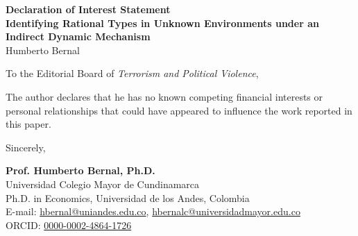 \documentclass[12pt]{article}
\begin{document}
\singlespacing

\begin{center}
\textbf{Declaration of Interest Statement} \\
\vspace{1em}
\textbf{Identifying Rational Types in Unknown Environments under an Indirect Dynamic Mechanism} \\
Humberto Bernal
\end{center}

\vspace{3em}

\noindent To the Editorial Board of \textit{Terrorism and Political Violence},

\vspace{2em}

\noindent The author declares that he has no known competing financial interests or personal relationships that could have appeared to influence the work reported in this paper.

\vspace{4em}

\begin{flushleft}
Sincerely,

\vspace{3em}

\textbf{Prof. Humberto Bernal, Ph.D.} \\
Universidad Colegio Mayor de Cundinamarca \\
Ph.D. in Economics, Universidad de los Andes, Colombia \\
E-mail: \href{mailto:hbernal@uniandes.edu.co}{hbernal@uniandes.edu.co}, \href{mailto:hbernalc@universidadmayor.edu.co}{hbernalc@universidadmayor.edu.co} \\
ORCID: \href{https://orcid.org/0000-0002-4864-1726}{0000-0002-4864-1726}
\end{flushleft}
\end{document}
